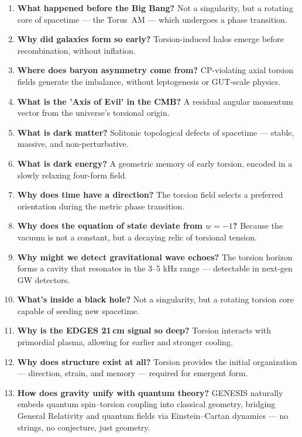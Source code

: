\documentclass{article}
\begin{document}
\begin{enumerate}
    \item \textbf{What happened before the Big Bang?}  
    Not a singularity, but a rotating core of spacetime — the Torus~AM — which undergoes a phase transition.

    \item \textbf{Why did galaxies form so early?}  
    Torsion-induced halos emerge before recombination, without inflation.

    \item \textbf{Where does baryon asymmetry come from?}  
    CP-violating axial torsion fields generate the imbalance, without leptogenesis or GUT-scale physics.

    \item \textbf{What is the 'Axis of Evil' in the CMB?}  
    A residual angular momentum vector from the universe’s torsional origin.

    \item \textbf{What is dark matter?}  
    Solitonic topological defects of spacetime — stable, massive, and non-perturbative.

    \item \textbf{What is dark energy?}  
    A geometric memory of early torsion, encoded in a slowly relaxing four-form field.

    \item \textbf{Why does time have a direction?}  
    The torsion field selects a preferred orientation during the metric phase transition.

    \item \textbf{Why does the equation of state deviate from $w = -1$?}  
    Because the vacuum is not a constant, but a decaying relic of torsional tension.

    \item \textbf{Why might we detect gravitational wave echoes?}  
    The torsion horizon forms a cavity that resonates in the 3–5 kHz range — detectable in next-gen GW detectors.

    \item \textbf{What’s inside a black hole?}  
    Not a singularity, but a rotating torsion core capable of seeding new spacetime.

    \item \textbf{Why is the EDGES 21 cm signal so deep?}  
    Torsion interacts with primordial plasma, allowing for earlier and stronger cooling.

    \item \textbf{Why does structure exist at all?}  
    Torsion provides the initial organization — direction, strain, and memory — required for emergent form.

    \item \textbf{How does gravity unify with quantum theory?}  
    GENESIS naturally embeds quantum spin–torsion coupling into classical geometry, bridging General Relativity and quantum fields via Einstein–Cartan dynamics — no strings, no conjecture, just geometry.
\end{enumerate}
\end{document}
